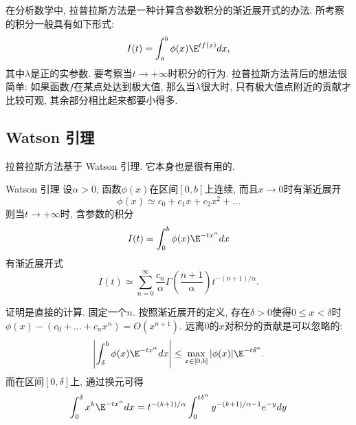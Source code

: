 

在分析数学中, 拉普拉斯方法是一种计算含参数积分的渐近展开式的办法. 所考察的积分一般具有如下形式:
\begin{equation}\label{LapAsm_eq1}
I(t)=\int_a^b \phi(x)\E^{t f(x)}dx,
\end{equation}
其中$\lambda$是正的实参数. 要考察当$t\to+\infty$时积分的行为. 拉普拉斯方法背后的想法很简单: 如果函数$f$在某点处达到极大值, 那么当$\lambda$很大时, 只有极大值点附近的贡献才比较可观, 其余部分相比起来都要小得多.

\subsection{Watson 引理}
拉普拉斯方法基于 Watson 引理. 它本身也是很有用的.

\begin{lemma}{Watson 引理}
设$\alpha>0$, 函数$\phi(x)$在区间$[0,b]$上连续, 而且$x\to0$时有渐近展开
$$
\phi(x)\simeq c_0+c_1x+c_2x^2+...
$$
则当$t\to+\infty$时, 含参数的积分
$$
I(t)=\int_0^b \phi(x)\E^{-t x^\alpha}dx
$$
有渐近展开式
$$
I(t)\simeq\sum_{n=0}^\infty \frac{c_n}{\alpha}\Gamma\left(\frac{n+1}{\alpha}\right)t^{-(n+1)/\alpha}.
$$
\end{lemma}

证明是直接的计算. 固定一个$n$. 按照渐近展开的定义, 存在$\delta>0$使得$0\leq x<\delta$时$\phi(x)-(c_0+...+c_nx^n)=O(x^{n+1})$. 远离$0$的$x$对积分的贡献是可以忽略的:
$$
\left|\int_\delta^b\phi(x)\E^{-tx^\alpha}dx\right|
\leq\max_{x\in[0,b]}|\phi(x)|\E^{-t\delta^\alpha}.
$$
而在区间$[0,\delta]$上, 通过换元可得
$$
\int_0^\delta x^k\E^{-tx^\alpha}dx
=t^{-(k+1)/\alpha}\int_0^{t\delta^\alpha}y^{-(k+1)/\alpha-1}e^{-y}dy
$$
